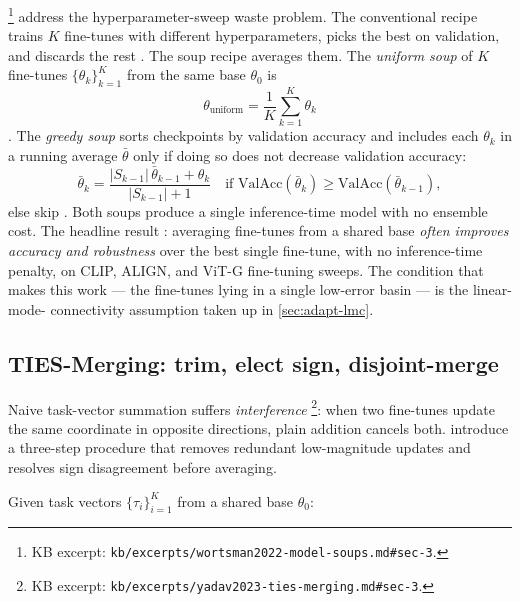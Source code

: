 \citet{wortsman2022-model-soups}\footnote{KB excerpt:
\texttt{kb/excerpts/wortsman2022-model-soups.md\#sec-3}.} address the
hyperparameter-sweep waste problem. The conventional recipe trains $K$
fine-tunes with different hyperparameters, picks the best on
validation, and discards the rest \citep[\S 1]{wortsman2022-model-soups}.
The soup recipe averages them. The \emph{uniform soup} of $K$ fine-tunes
$\{\theta_k\}_{k=1}^K$ from the same base $\theta_0$ is
\begin{equation}
\theta_{\text{uniform}} = \frac{1}{K}\sum_{k=1}^K \theta_k
\label{eq:soup-uniform}
\end{equation}
\citep[\S 3]{wortsman2022-model-soups}. The \emph{greedy soup} sorts
checkpoints by validation accuracy and includes each $\theta_k$ in a
running average $\bar\theta$ only if doing so does not decrease
validation accuracy:
\begin{equation}
\bar\theta_k = \frac{|S_{k-1}|\, \bar\theta_{k-1} + \theta_k}{|S_{k-1}| + 1}
\quad
\text{if } \mathrm{ValAcc}(\bar\theta_k) \geq \mathrm{ValAcc}(\bar\theta_{k-1}),
\label{eq:soup-greedy}
\end{equation}
else skip \citep[\S 3]{wortsman2022-model-soups}. Both soups produce a
single inference-time model with no ensemble cost. The headline result
\citep[\S 1, \S 4]{wortsman2022-model-soups}: averaging fine-tunes from
a shared base \emph{often improves accuracy and robustness} over the
best single fine-tune, with no inference-time penalty, on CLIP, ALIGN,
and ViT-G fine-tuning sweeps. The condition that makes this work — the
fine-tunes lying in a single low-error basin — is the linear-mode-
connectivity assumption taken up in \cref{sec:adapt-lmc}.

\subsection{TIES-Merging: trim, elect sign, disjoint-merge}
\label{sec:adapt-ties}

Naive task-vector summation suffers \emph{interference}
\citep[abstract]{yadav2023-ties-merging}\footnote{KB excerpt:
\texttt{kb/excerpts/yadav2023-ties-merging.md\#sec-3}.}: when two
fine-tunes update the same coordinate in opposite directions, plain
addition cancels both. \citet{yadav2023-ties-merging} introduce a
three-step procedure that removes redundant low-magnitude updates and
resolves sign disagreement before averaging.

Given task vectors $\{\tau_i\}_{i=1}^K$ from a shared base $\theta_0$:

